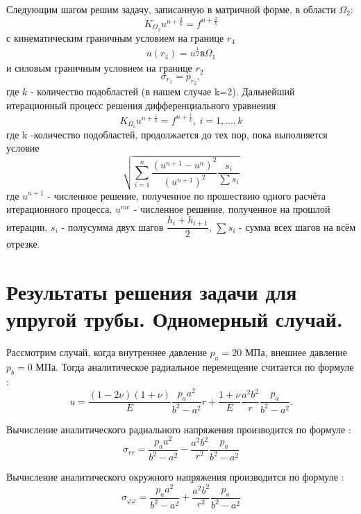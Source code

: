 \documentclass[a4paper,14pt]{extarticle}
\begin{document}
Следующим шагом решим задачу, записанную в матричной форме, в области $\Omega_{2}$:
\begin{equation}
K_{\Omega_{2}} u^{n+\frac{2}{k}} = f^{n+\frac{2}{k}}
\end{equation}
с кинематическим граничным условием на границе $r_4$
\begin{align*}
u(r_4)=u^{\frac{1}{2}} в \Omega_1
\end{align*}
и силовым граничным условием на границе $r_2$
\begin{equation}
\sigma_{r_2}=p_{r_2},
\end{equation}
где $k$ - количество подобластей (в нашем случае k=2). 
Дальнейший итерационный процесс решения дифференциального уравнения 
\begin{equation}
K_{\Omega_{i}} u^{n+\frac{i}{k}} = f^{n+\frac{i}{k}}, \  i=1,\ldots,k
\end{equation}
где k -количество подобластей, продолжается до тех пор, пока выполняется условие
\begin{equation}
\sqrt{\sum_{i=1}^{n} \dfrac{ (u^{n+1}-u^{n})^2}{ (u^{n+1})^2 }\dfrac{s_{i}}{\sum{s_i}}}
\end{equation}
где $u^{n+1}$ - численное решение, полученное по прошествию одного расчёта итерационного процесса, $u^{me}$ - численное решение, полученное на прошлой итерации, $s_i$ - полусумма двух шагов $\dfrac{h_i+h_{i+1}}{2}$, $\sum{s_i}$ - сумма всех шагов на всём отрезке.  


\newpage
\section{Результаты решения задачи для упругой трубы. Одномерный случай.}

Рассмотрим случай, когда внутреннее давление $p_a=20$ МПа, внешнее давление $p_b=0$ МПа. Тогда аналитическое радиальное перемещение считается по формуле :
\begin{equation}\label{perem}
u=\frac{\left(1-2\nu\right)\left(1+\nu\right)}{E} \frac{p_a a^2}{b^2-a^2}r+\frac{1+\nu}{E}\frac{a^2 b^2}{r}\frac{p_a}{b^2-a^2}.
\end{equation}

Вычисление аналитического радиального напряжения производится по формуле :
\begin{equation}
\sigma_{rr}=\frac{p_a a^2}{b^2-a^2}-\frac{a^2 b^2}{r^2}\frac{p_a}{b^2 -a^2}
\end{equation}

Вычисление аналитического окружного напряжения производится по формуле :
\begin{equation}
\sigma_{\varphi\varphi}=\frac{p_a a^2}{b^2-a^2}+\frac{a^2 b^2}{r^2}\frac{p_a}{b^2 -a^2}
\end{equation}	
\end{document}
